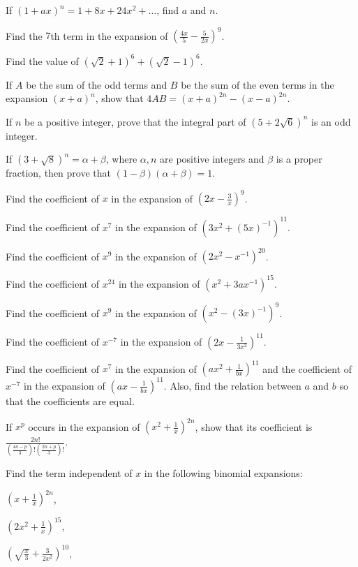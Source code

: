 \item If $(1 + ax)^n = 1 + 8x + 24x^2 + \ldots$, find $a$ and $n$.
\item Find the $7$th term in the expansion of $\left(\frac{4x}{5} - \frac{5}{2x}\right)^9$.
\item Find the value of $(\sqrt{2} + 1)^6 + (\sqrt{2} - 1)^6$.
\item If $A$ be the sum of the odd terms and $B$ be the sum of the even terms in the expansion $(x + a)^n$, show that $4AB = (x +
  a)^{2n} - (x - a)^{2n}$.
\item If $n$ be a positive integer, prove that the integral part of $(5 + 2\sqrt{6})^n$ is an odd integer.
\item If $(3 + \sqrt{8})^n = \alpha + \beta$, where $\alpha, n$ are positive integers and $\beta$ is a proper fraction, then prove
  that $(1 - \beta)(\alpha + \beta) = 1$.
\item Find the coefficient of $x$ in the expansion of $\left(2x - \frac{3}{x}\right)^9$.
\item Find the coefficient of $x^7$ in the expansion of $(3x^2 + (5x)^{-1})^{11}$.
\item Find the coefficient of $x^9$ in the expansion of $(2x^2 - x^{-1})^{20}$.
\item Find the coefficient of $x^{24}$ in the expansion of $(x^2 + 3ax^{-1})^{15}$.
\item Find the coefficient of $x^9$ in the expansion of $(x^2 - (3x)^{-1})^9$.
\item Find the coefficient of $x^{-7}$ in the expansion of $\left(2x - \frac{1}{3x^2}\right)^{11}$.
\item Find the coefficient of $x^7$ in the expansion of $\left(ax^2 + \frac{1}{bx}\right)^{11}$ and the coefficient of $x^{-7}$ in
  the expansion of $\left(ax - \frac{1}{bx}\right)^{11}$. Also, find the relation between $a$ and $b$ so that the coefficients are
  equal.
\item If $x^p$ occurs in the expansion of $\left(x^2 + \frac{1}{x}\right)^{2n}$, show that its coefficient is
  $\frac{2n!}{\left(\frac{4n - p}{3}\right)!\left(\frac{2n + p}{3}\right)!}$.
\item Find the term independent of $x$ in the following binomial expansions:
  \startitemize[i]
  \item $\left(x + \frac{1}{x}\right)^{2n}$,
  \item $\left(2x^2 + \frac{1}{x}\right)^{15}$,
  \item $\left(\sqrt{\frac{x}{3}} + \frac{3}{2x^2}\right)^{10}$,
